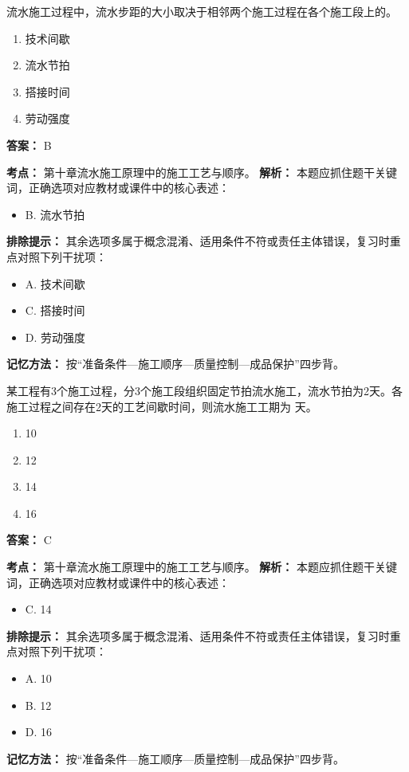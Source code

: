 \documentclass[UTF8,fontset=fandol,11pt]{ctexart}
\begin{document}
\vspace{0.2em}

\begin{quizbox}[title={第 9 题}]
流水施工过程中，流水步距的大小取决于相邻两个施工过程在各个施工段上的。\\
\begin{enumerate}[label=\Alph*.]
\item 技术间歇
\item 流水节拍
\item 搭接时间
\item 劳动强度
\end{enumerate}
\textbf{答案：} B
\vspace{0.25em}
\begin{answerbox}[title={考点解析}]
\textbf{考点：} 第十章流水施工原理中的施工工艺与顺序。
\textbf{解析：} 本题应抓住题干关键词，正确选项对应教材或课件中的核心表述：
\begin{itemize}
\item B. 流水节拍
\end{itemize}
\textbf{排除提示：} 其余选项多属于概念混淆、适用条件不符或责任主体错误，复习时重点对照下列干扰项：
\begin{itemize}
\item A. 技术间歇
\item C. 搭接时间
\item D. 劳动强度
\end{itemize}
\textbf{记忆方法：} 按“准备条件—施工顺序—质量控制—成品保护”四步背。
\end{answerbox}
\end{quizbox}

\vspace{0.2em}

\begin{quizbox}[title={第 10 题}]
某工程有3个施工过程，分3个施工段组织固定节拍流水施工，流水节拍为2天。各施工过程之间存在2天的工艺间歇时间，则流水施工工期为 天。\\
\begin{enumerate}[label=\Alph*.]
\item 10
\item 12
\item 14
\item 16
\end{enumerate}
\textbf{答案：} C
\vspace{0.25em}
\begin{answerbox}[title={考点解析}]
\textbf{考点：} 第十章流水施工原理中的施工工艺与顺序。
\textbf{解析：} 本题应抓住题干关键词，正确选项对应教材或课件中的核心表述：
\begin{itemize}
\item C. 14
\end{itemize}
\textbf{排除提示：} 其余选项多属于概念混淆、适用条件不符或责任主体错误，复习时重点对照下列干扰项：
\begin{itemize}
\item A. 10
\item B. 12
\item D. 16
\end{itemize}
\textbf{记忆方法：} 按“准备条件—施工顺序—质量控制—成品保护”四步背。
\end{answerbox}
\end{quizbox}
\end{document}

